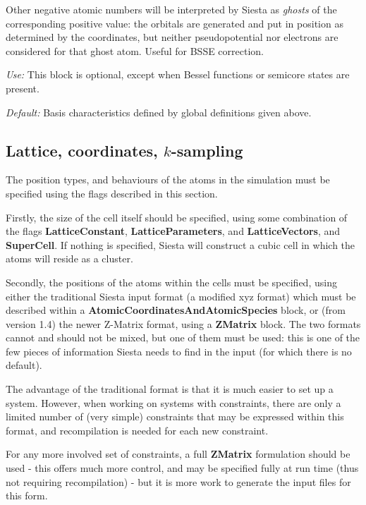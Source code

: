 \documentclass[11pt]{article}
\begin{document}
\begin{description}
Other negative atomic numbers will be interpreted by {\sc Siesta} as 
{\it ghosts} 
of the corresponding positive value: the orbitals
are generated and put in position as determined by the coordinates,
but neither pseudopotential nor electrons are considered for that
ghost atom. Useful for BSSE correction.

{\it Use:} This block is optional, except when Bessel functions or
semicore states are present. 

{\it Default:} Basis characteristics defined by global definitions given
above.

\end{description}


\vspace{5pt}
\subsection{Lattice, coordinates, $k$-sampling}

The position types, and behaviours of the atoms in the simulation
must be specified using the flags described in this section.

Firstly, the size of the cell itself should be specified, using
some combination of the flags
\textbf{LatticeConstant}, \textbf{LatticeParameters},
and \textbf{LatticeVectors}, and \textbf{SuperCell}.
If nothing is specified, {\sc Siesta} will construct a cubic
cell in which the atoms will reside as a cluster.

Secondly, the positions of the atoms within the cells
must be specified, using either the traditional {\sc Siesta}
input format (a modified xyz format) which must be described 
within
a \textbf{AtomicCoordinatesAndAtomicSpecies} block, or 
(from version 1.4) the newer Z-Matrix format, using a
\textbf{ZMatrix} block. The two formats cannot and
should not be mixed, but one of them must be used: 
this is one of the few pieces of information {\sc Siesta}
needs to find in the input (for which there is no default).

The advantage of the traditional format is that it is
much easier to set up a system. However, when working
on systems with constraints, there are only a limited
number of (very simple) constraints that may be expressed
within this format, and recompilation is needed for each
new constraint. 

For any more involved set of constraints, a 
full \textbf{ZMatrix} formulation should be used - this
offers much more control, and may be specified fully at
run time (thus not requiring recompilation) - but
it is more work to generate the input files for this form.
\end{document}
